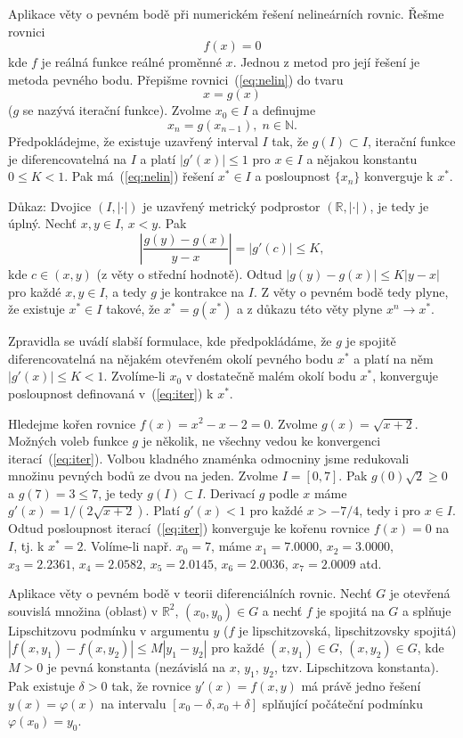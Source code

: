 {Aplikace věty o pevném bodě při numerickém řešení nelineárních rovnic.}
Řešme rovnici 
\begin{equation}\label{eq:nelin}
   f(x)=0
\end{equation}
kde $f$ je reálná funkce reálné proměnné $x$.
Jednou z metod pro její řešení je metoda pevného bodu.
Přepišme rovnici~(\ref{eq:nelin}) do tvaru
\[
   x = g(x)
\]
($g$ se nazývá iterační funkce).
Zvolme $x_0\in I$ a definujme
\begin{equation}\label{eq:iter}
   x_n = g(x_{n-1}), \; n\in\mathbb{N}.
\end{equation}
Předpokládejme, že existuje uzavřený interval $I$ tak, že $g(I)\subset I$,
iterační funkce je diferencovatelná na $I$ a platí $|g'(x)|\leq 1$ pro $x\in I$
a nějakou konstantu $0\leq K<1$.
Pak má~(\ref{eq:nelin}) řešení $x^*\in I$ a posloupnost $\{x_n\}$ konverguje k $x^*$.

Důkaz: Dvojice $(I,|\cdot|)$ je uzavřený metrický podprostor $(\mathbb{R},|\cdot|)$,
je tedy je úplný. Nechť $x,y\in I$, $x<y$. Pak
\[
   \left|\frac{g(y) - g(x)}{y-x}\right| = |g'(c)| \leq K,
\]
kde $c\in(x,y)$ (z věty o střední hodnotě).
Odtud $|g(y) - g(x)| \leq K|y-x|$ pro každé $x,y\in I$,
a tedy $g$ je kontrakce na $I$.
Z věty o pevném bodě tedy plyne, že existuje $x^*\in I$ takové,
že $x^*=g(x^*)$ a z důkazu této věty plyne $x^n\rightarrow x^*$.

Zpravidla se uvádí slabší formulace, kde předpokládáme, že $g$
je spojitě diferencovatelná na nějakém otevřeném okolí pevného bodu $x^*$
a platí na něm $|g'(x)|\leq K<1$. Zvolíme-li $x_0$ v dostatečně malém okolí
bodu $x^*$, konverguje posloupnost definovaná v~(\ref{eq:iter}) k $x^*$.


   Hledejme kořen rovnice $f(x)=x^2-x-2=0$.
   Zvolme $g(x)=\sqrt{x+2}$. 
   Možných voleb funkce $g$ je několik,
   ne všechny vedou ke konvergenci iterací~(\ref{eq:iter}).
   Volbou kladného znaménka odmocniny jsme redukovali množinu pevných bodů
   ze dvou na jeden.
   Zvolme $I=[0,7]$. Pak $g(0)\sqrt{2}\geq 0$ a $g(7)=3\leq 7$,
   je tedy $g(I)\subset I$.
   Derivací $g$ podle $x$ máme $g'(x)=1/(2\sqrt{x+2})$.
   Platí $g'(x)<1$ pro každé $x>-7/4$, tedy i pro $x\in I$.
   Odtud posloupnost iterací~(\ref{eq:iter}) konverguje ke kořenu
   rovnice $f(x)=0$ na $I$, tj. k $x^*=2$.
   Volíme-li např. $x_0=7$, máme
   $x_1=7.0000$, $x_2=3.0000$, $x_3=2.2361$, $x_4=2.0582$,
   $x_5=2.0145$, $x_6=2.0036$, $x_7=2.0009$ atd.


{Aplikace věty o pevném bodě v teorii diferenciálních rovnic.}
Nechť $G$ je otevřená souvislá množina (oblast) v $\mathbb{R}^2$,
$(x_0,y_0)\in G$ a nechť $f$ je spojitá na $G$ 
a splňuje Lipschitzovu podmínku v argumentu $y$
($f$ je lipschitzovská, lipschitzovsky spojitá)
$|f(x,y_1)-f(x,y_2)|\leq M|y_1-y_2|$ pro každé $(x,y_1)\in G$, $(x,y_2)\in G$,
kde $M>0$ je pevná konstanta (nezávislá na $x$, $y_1$, $y_2$,
tzv. Lipschitzova konstanta).
Pak existuje $\delta > 0$ tak, že rovnice $y'(x) = f(x,y)$ má právě jedno řešení
$y(x)=\varphi(x)$ na intervalu $[x_0-\delta,x_0+\delta]$ splňující
počáteční podmínku $\varphi(x_0)=y_0$.

